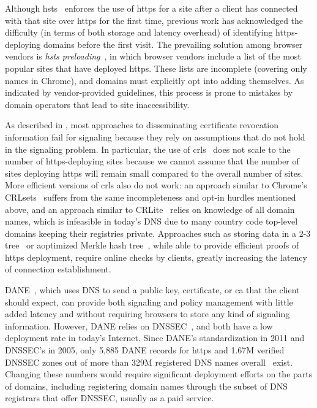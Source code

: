 Although \ac{hsts}~\cite{rfc6797} enforces the use of \ac{https} for a site
after a client has connected with that site over \ac{https} for the first time,
previous work has acknowledged the difficulty (in terms of both storage and
latency overhead) of identifying \ac{https}-deploying domains before the first
visit. The prevailing solution among browser vendors is \emph{\ac{hsts}
preloading}~\cite{keeler2012preloading}, in which browser vendors include a list
of the most popular sites that have deployed \ac{https}. These lists are
incomplete (covering only  names in Chrome), and domains
must explicitly opt into adding themselves. As indicated by vendor-provided
guidelines, this process is prone to
mistakes by domain operators that lead to site inaccessibility.

As described in ,
most approaches to disseminating certificate revocation information fail for
signaling because they rely on assumptions that do not hold in the signaling
problem. In particular, the use of \acp{crl}~\cite{rfc5280} does not scale to
the number of \ac{https}-deploying sites because we cannot assume that the
number of sites deploying \ac{https} will remain small compared to the overall
number of sites. More efficient versions of \acp{crl} also do not work: an
approach similar to Chrome's CRLsets~\cite{langley2012revocation} suffers from
the same incompleteness and opt-in hurdles mentioned above, and an approach
similar to CRLite~\cite{larisch2017crlite} relies on knowledge of all domain
names, which is infeasible in today's DNS due to many country code top-level
domains keeping their registries private. Approaches such as storing data in a
2-3 tree~\cite{naor1998certificate} or aoptimized Merkle hash
tree~\cite{laurie2012revocation}, while able to provide efficient proofs of
\ac{https} deployment, require online checks by clients, greatly increasing the
latency of connection establishment.

DANE~\cite{rfc6698}, which uses DNS to send a public key, certificate, or
\ac{ca} that the client should expect, can provide both signaling and policy
management with little added latency and without requiring browsers to store any
kind of signaling information. However, DANE relies on DNSSEC~\cite{rfc4033},
and both have a low deployment rate in today's Internet. Since DANE's
standardization in 2011 and DNSSEC's in 2005, only 5,885 DANE records for
\ac{https} and 1.67M verified DNSSEC zones out of more than 329M registered DNS
names overall~\cite{dnib-14-1}
exist. Changing these numbers would require significant deployment efforts
on the parts of domains, including registering domain names through the subset
of DNS registrars that offer DNSSEC, usually as a paid service.
